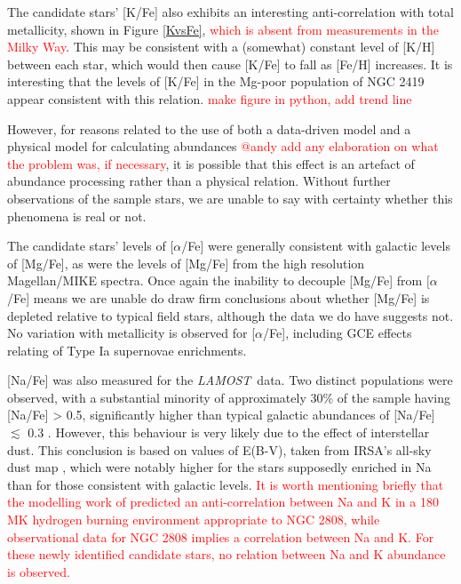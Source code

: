 \documentclass[a4paper,fleqn,usenatbib]{mnras}
\newcommand{\todo}[1]{\textcolor{red}{#1}}
\newcommand{\project}[1]{\emph{#1}}
\newcommand{\lamost}{\project{LAMOST}}
\begin{document}
The candidate stars' [K/Fe] also exhibits an interesting anti-correlation with total metallicity, shown in Figure \ref{KvsFe}, \todo{which is absent from measurements in the Milky Way}. This may be consistent with a (somewhat) constant level of [K/H] between each star, which would then cause [K/Fe] to fall as [Fe/H] increases. It is interesting that the levels of [K/Fe] in the Mg-poor population of NGC 2419 appear consistent with this relation. \todo{make figure in python, add trend line}

However, for reasons related to the use of both a data-driven model and a physical model for calculating abundances \todo{@andy add any elaboration on what the problem was, if necessary}, it is possible that this effect is an artefact of abundance processing rather than a physical relation. Without further observations of the sample stars, we are unable to say with certainty whether this phenomena is real or not.

The candidate stars' levels of [$\alpha$/Fe] were generally consistent with galactic levels of [Mg/Fe], as were the levels of [Mg/Fe] from the high resolution Magellan/MIKE spectra. Once again the inability to decouple [Mg/Fe] from $[\alpha$/Fe] means we are unable do draw firm conclusions about whether [Mg/Fe] is depleted relative to typical field stars, although the data we do have suggests not. No variation with metallicity is observed for [$\alpha$/Fe], including GCE effects relating of Type Ia supernovae enrichments.


[Na/Fe] was also measured for the \lamost\ data. Two distinct populations were observed, with a substantial minority of approximately 30\% of the sample having [Na/Fe] > 0.5, significantly higher than typical galactic abundances of [Na/Fe] $\lesssim$ 0.3 \citep{kobayashi2011}. However, this behaviour is very likely due to the effect of interstellar dust. This conclusion is based on values of E(B-V), taken from IRSA's all-sky dust map \citep{schlafly2011}, which were notably higher for the stars supposedly enriched in Na than for those consistent with galactic levels. \todo{It is worth mentioning briefly that the modelling work of \cite{prantzos2017} predicted an anti-correlation between Na and K in a 180 MK hydrogen burning environment appropriate to NGC 2808, while observational data for NGC 2808 implies a correlation between Na and K. For these newly identified candidate stars, no relation between Na and K abundance is observed.}
\end{document}

